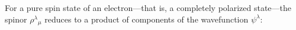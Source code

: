For a pure spin state of an electron---that is, a completely polarized
state---the spinor $\rho^\lambda{}_\mu$ reduces to a product of components of
the wavefunction $\psi^\lambda$:
